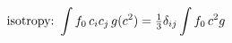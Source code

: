 \documentclass[preview]{standalone}
\begin{document}
\begin{align*}
\special{dvisvgm:raw <g id='unique000'>}\text{isotropy:}\ \int f_0\,c_ic_j\,g(c^2)=\tfrac13\delta_{ij}\int f_0\,c^2g\special{dvisvgm:raw </g>}
\end{align*}
\end{document}
